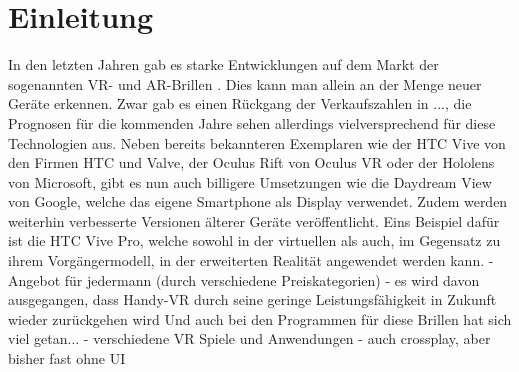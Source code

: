 
\chapter{Einleitung}\label{chapter:introduction}

	
	
	
	In den letzten Jahren gab es starke Entwicklungen auf dem Markt der sogenannten VR- und AR-Brillen . Dies kann man allein an der Menge neuer Geräte erkennen.
	Zwar gab es einen Rückgang der Verkaufszahlen in ..., die Prognosen für die kommenden Jahre sehen allerdings vielversprechend für diese Technologien aus.
	Neben bereits bekannteren Exemplaren wie der HTC Vive von den Firmen HTC und Valve, der Oculus Rift von Oculus VR oder der Hololens von Microsoft, gibt es nun auch billigere Umsetzungen wie die Daydream View von Google, welche das eigene Smartphone als Display verwendet. Zudem werden weiterhin verbesserte Versionen älterer Geräte veröffentlicht. Eins Beispiel dafür ist die HTC Vive Pro, welche sowohl in der virtuellen als auch, im Gegensatz zu ihrem Vorgängermodell, in der erweiterten Realität angewendet werden kann.
	- Angebot für jedermann (durch verschiedene Preiskategorien)
	- es wird davon ausgegangen, dass Handy-VR durch seine geringe Leistungsfähigkeit in Zukunft wieder zurückgehen wird
	Und auch bei den Programmen für diese Brillen hat sich viel getan...
	- verschiedene VR Spiele und Anwendungen
	- auch crossplay, aber bisher fast ohne UI

